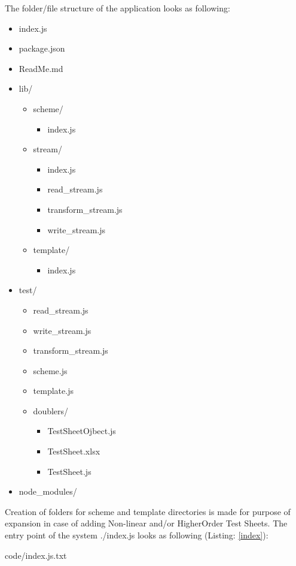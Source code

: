The folder/file structure of the application looks as following:
\begin{itemize}
	\item index.js
	\item package.json
	\item ReadMe.md
	\item lib/
	\begin{itemize}
		\item scheme/
		\begin{itemize}
			\item index.js
		\end{itemize}
		\item stream/
		\begin{itemize}
			\item index.js
			\item read\_stream.js
			\item transform\_stream.js
			\item write\_stream.js
		\end{itemize}
		\item template/
		\begin{itemize}
			\item index.js
		\end{itemize}
	\end{itemize}
	\item test/
	\begin{itemize}
		\item read\_stream.js
		\item write\_stream.js
		\item transform\_stream.js
		\item scheme.js
		\item template.js
		\item doublers/
		\begin{itemize}
			\item TestSheetOjbect.js
			\item TestSheet.xlsx
			\item TestSheet.js
		\end{itemize}
	\end{itemize}
	\item node\_modules/
\end{itemize}
Creation of folders for scheme and template directories is made for purpose of expansion in case of adding Non-linear and/or HigherOrder Test Sheets. 
The entry point of the system ./index.js looks as following (Listing: \ref{index}):


{code/index.js.txt}

